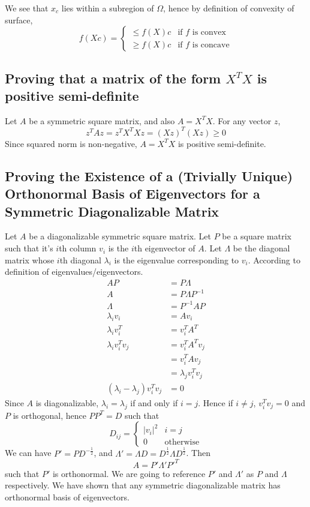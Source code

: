 \documentclass{article}
\numberwithin{equation}{subsection}
\begin{document}
We see that $x_c$ lies within a subregion of $\Omega$, hence by definition of convexity of surface, 
\begin{equation}
    f(Xc) = 
    \begin{cases}
        \leq  f(X)c & \text{if $f$ is convex}\\
        \geq  f(X)c & \text{if $f$ is concave}
    \end{cases}
\end{equation}
\subsection{Proving that a matrix of the form $X^TX$ is positive semi-definite}
Let $A$ be a symmetric square matrix, and also $A=X^TX$. For any vector $z$, 
\begin{equation}
z^TAz = z^TX^TXz = (Xz)^T(Xz) \geq 0
\end{equation}
Since squared norm is non-negative, $A=X^TX$ is positive semi-definite.
\subsection{Proving the Existence of a (Trivially Unique) Orthonormal Basis of Eigenvectors for a Symmetric Diagonalizable Matrix}
Let $A$ be a diagonalizable symmetric square matrix. Let $P$ be a square matrix such that it's $i$th column $v_i$ is the $i$th eigenvector of $A$. Let $\Lambda$ be the diagonal matrix whose $i$th diagonal $\lambda_i$ is the eigenvalue corresponding to $v_i$. According to definition of eigenvalues/eigenvectors.
\begin{align}
    AP &= P\Lambda\\
    A &= P\Lambda P^{-1}\\
    \Lambda &= P^{-1}AP\\
    \lambda_iv_i &= Av_i\\
    \lambda_iv_i^T &= v_i^TA^T\\
    \lambda_iv_i^Tv_j &= v_i^TA^Tv_j\\
    &= v_i^TAv_j\\
    &= \lambda_jv_i^Tv_j\\
    (\lambda_i-\lambda_j)v_i^Tv_j &= 0
\end{align}
Since $A$ is diagonalizable, $\lambda_i=\lambda_j$ if and only if $i=j$. Hence if $i \neq j$, $v_i^Tv_j = 0$ and $P$ is orthogonal, hence 
$PP^T = D$ such that 
\begin{equation}
D_{ij} = \begin{cases}
    |v_i|^2 & i = j\\
    0 & \text{otherwise}
\end{cases}
\end{equation}
We can have $P' = PD^{-\frac{1}{2}}$, and $\Lambda' = \Lambda D = D^{\frac{1}{2}} \Lambda D^{\frac{1}{2}}$. Then
\begin{equation}
    A = P'\Lambda'P'^T 
\end{equation}
such that $P'$ is orthonormal. We are going to reference $P'$ and $\Lambda'$ as $P$ and $\Lambda$ respectively. We have shown that any symmetric diagonalizable matrix has orthonormal basis of eigenvectors.
\end{document}
